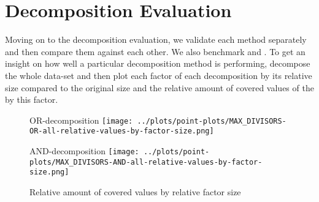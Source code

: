 \section{Decomposition Evaluation}
Moving on to the decomposition evaluation, we validate each method separately and then compare them against each other. We also benchmark \andDecomp and \orDecomp. To get an insight on how well a particular decomposition method is performing, decompose the whole data-set and then plot each factor of each decomposition by its relative size compared to the original \DFA size and the relative amount of covered values of the \DFA by this factor.
\begin{figure}[t]
	\begin{minipage}[h]{0.49\linewidth}
		\centering
		OR-decomposition
		\texttt{[image: ../plots/point-plots/MAX\_DIVISORS-OR-all-relative-values-by-factor-size.png]}
	\end{minipage}
	\begin{minipage}[h]{0.49\linewidth}
		\centering
		AND-decomposition
		\texttt{[image: ../plots/point-plots/MAX\_DIVISORS-AND-all-relative-values-by-factor-size.png]}
	\end{minipage}
	\caption{Relative amount of covered values by relative factor size}
	\label{fig:eval:max-divisor-all-factors}
\end{figure}

